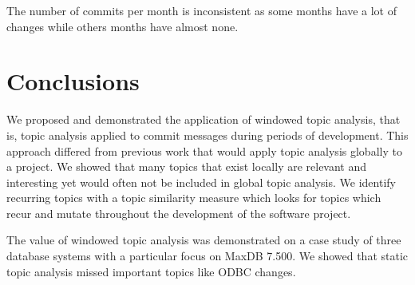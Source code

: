 \documentclass[times, 10pt,twocolumn]{article}
\begin{document}
The number of commits per month is inconsistent as some months have a
lot of changes while others months have almost none.





\section{Conclusions}












We proposed and demonstrated the application of windowed topic
analysis, that is, topic analysis applied to commit messages during
periods of development. This approach differed from previous work that
would apply topic analysis globally to a project. We showed that many
topics that exist locally are relevant and interesting yet would often
not be included in global topic analysis. We identify recurring topics
with a topic similarity measure which looks for topics which recur and
mutate throughout the development of the software project.

The value of windowed topic analysis was demonstrated on a case study
of three database systems with a particular focus on MaxDB 7.500. We
showed that static topic analysis missed important topics like ODBC
changes.
\end{document}
